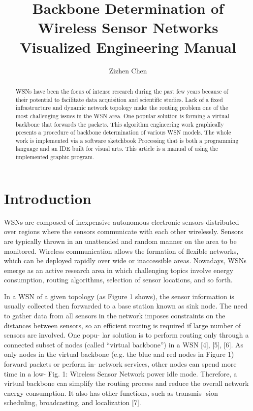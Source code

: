 \documentclass[11pt]{amsart}
\title[A big title]{Backbone Determination of Wireless Sensor Networks\\Visualized Engineering Manual}
\author{Zizhen Chen}
\begin{document}
\maketitle
\begin{abstract}
\acp{WSN} have been the focus of intense research during the past few years because of their potential to facilitate data acquisition and scientific studies\cite{werner2006deploying}. Lack of a fixed infrastructure and dynamic network topology make the routing problem one of the most challenging issues in the \ac{WSN} area. One popular solution is forming a virtual backbone that forwards the packets. This algorithm engineering work graphically presents a procedure of backbone determination of various \ac{WSN} models. The whole work is implemented via a software sketchbook Processing that is both a programming language and an \ac{IDE} built for visual arts\cite{reas2007processing}. This article is a manual of using the implemented graphic program.
\end{abstract}
\section{Introduction}
\acfp{WSN} are composed of inexpensive autonomous electronic sensors distributed over regions where the sensors communicate with each other wirelessly. Sensors are typically thrown in an unattended and random manner on the area to be monitored. Wireless communication allows the formation of flexible networks, which can be deployed rapidly over wide or inaccessible areas. Nowadays, WSNs emerge as an active research area in which challenging topics involve energy consumption, routing algorithms, selection of sensor locations, and so forth\cite{carlos2016wireless}.

In a \ac{WSN} of a given topology (as Figure 1 shows), the sensor information is usually collected then forwarded to a base station known as sink node. The need to gather data from all sensors in the network imposes constraints on the distances between sensors, so an efficient routing is required if large number of sensors are involved. One popu- lar solution is to perform routing only through a connected subset of nodes (called “virtual backbone”) in a WSN [4], [5], [6]. As only nodes in the virtual backbone (e.g. the blue and red nodes in Figure 1) forward packets or perform in- network services, other nodes can spend more time in a low-
Fig. 1: Wireless Sensor Network
power idle mode. Therefore, a virtual backbone can simplify the routing process and reduce the overall network energy consumption. It also has other functions, such as transmis- sion scheduling, broadcasting, and localization [7].



\end{document}
